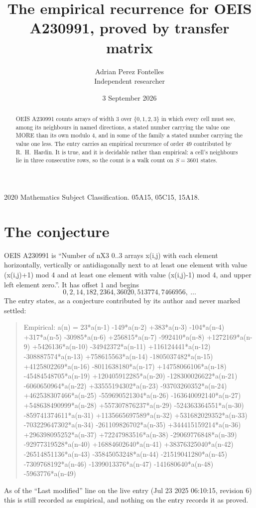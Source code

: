 \documentclass[11pt,a4paper]{article}
\title{The empirical recurrence for OEIS A230991, proved by transfer matrix}
\author{Adrian Perez Fontelles\\ \small Independent researcher}
\date{3 September 2026}
\theoremstyle{plain}
\theoremstyle{definition}
\begin{document}
\maketitle

\begin{abstract}
OEIS A230991 counts arrays of width $3$ over $\{0,1,2,3\}$ in which every cell must see, among its
neighbours in named directions, a stated number carrying the value one MORE than its own
modulo $4$, and in some of the family a stated number carrying the value one less. The entry
carries an empirical recurrence of order $49$ contributed by R.~H.~Hardin. It is true, and
it is decidable rather than empirical: a cell's neighbours lie in three consecutive rows, so
the count is a walk count on $S=3601$ states.
\end{abstract}

\noindent\small 2020 Mathematics Subject Classification. 05A15, 05C15, 15A18.\normalsize

\section{The conjecture}

OEIS A230991 is ``Number of nX3 0..3 arrays x(i,j) with each element horizontally, vertically or antidiagonally next to at least one element with value (x(i,j)+1) mod 4 and at least one element with value (x(i,j)-1) mod 4, and upper left element zero.''. It has offset $1$ and begins
\[
0, 2, 14, 182, 2364, 36020, 513774, 7466956,\ \dots
\]
The entry states, as a conjecture contributed by its author and never marked settled:
\begin{quote}
Empirical: a(n) = 23*a(n-1) -149*a(n-2) +383*a(n-3) -104*a(n-4) +317*a(n-5) -30985*a(n-6) +256815*a(n-7) -992410*a(n-8) +1272169*a(n-9) +5426136*a(n-10) -34942372*a(n-11) +116124441*a(n-12) -308887574*a(n-13) +758615563*a(n-14) -1805037482*a(n-15) +4125802269*a(n-16) -8011638180*a(n-17) +14758066106*a(n-18) -45484548705*a(n-19) +120405912285*a(n-20) -128300026622*a(n-21) -6060650964*a(n-22) +33555194302*a(n-23) -93703260352*a(n-24) +462538307466*a(n-25) -559690521304*a(n-26) -163640092140*a(n-27) +548638490999*a(n-28) +557307876237*a(n-29) -524363364551*a(n-30) -859741374611*a(n-31) +1135665697589*a(n-32) +531682029352*a(n-33) -703229647302*a(n-34) -261109826702*a(n-35) +344415159214*a(n-36) +296398095252*a(n-37) +72247983516*a(n-38) -29069776848*a(n-39) -92977319528*a(n-40) +16884602640*a(n-41) +38376325040*a(n-42) -26514851136*a(n-43) -35845053248*a(n-44) -21519041280*a(n-45) -7309768192*a(n-46) -1399013376*a(n-47) -141680640*a(n-48) -5963776*a(n-49)
\end{quote}
As of the ``Last modified'' line on the live entry (Jul 23 2025 06:10:15, revision 6) this is still
recorded as empirical, and nothing on the entry records it as proved.
\end{document}
